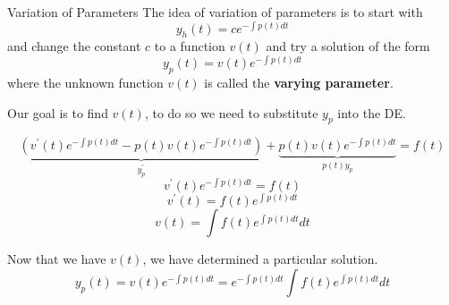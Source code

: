 \documentclass{beamer}
\begin{document}
\begin{frame}
\begin{block}{Variation of Parameters}
The idea of variation of parameters is to start with
\begin{equation*}
y_h(t)=c e^{-\int p(t) dt}
\end{equation*}
and change the constant $c$ to a function $v(t)$ and try a solution of the form
\begin{equation*}
y_p(t)=v(t) e^{-\int p(t) dt}
\end{equation*}
where the unknown function $v(t)$ is called the \textbf{varying parameter}.

\vspace{2mm}
Our goal is to find $v(t)$, to do so we need to substitute $y_p$ into the DE\@.

\vspace{-4mm}
\begin{overprint}
\begin{equation*}
\underbrace{\left(v^\prime(t) e^{-\int p(t)dt}-p(t)v(t) e^{-\int p(t)dt}\right)}_{y^\prime_p}
+
\underbrace{p(t)v(t)e^{-\int p(t)dt}}_{p(t)y_p} = f(t)
\end{equation*}
\vspace{4mm}
\begin{equation*}
v^\prime(t) e^{-\int p(t)dt} = f(t)
\end{equation*}
\vspace{4mm}
\begin{equation*}
v^\prime(t) = f(t) e^{\int p(t)dt}
\end{equation*}
\vspace{3mm}
\begin{equation*}
v(t) = \int f(t) e^{\int p(t)dt} dt
\end{equation*}
\end{overprint}
\vspace{-4mm}
Now that we have $v(t)$, we have determined a particular solution.
\begin{equation*}
y_p(t) = v(t) e^{-\int p(t) dt} = e^{-\int p(t) dt} \int f(t) e^{\int p(t)dt} dt 
\end{equation*}
\end{block}
\end{frame}
\end{document}
